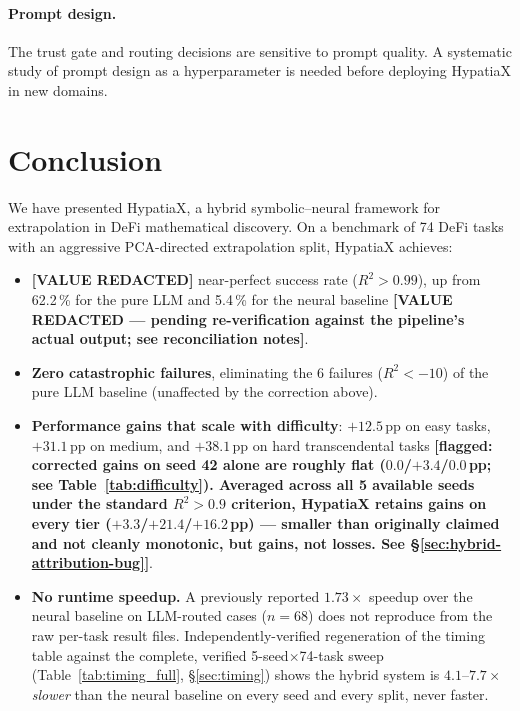 \documentclass[twoside,11pt]{article}
\newcommand{\Rsq}{R^{2}}
\begin{document}
\paragraph{Prompt design.}
The trust gate and routing decisions are sensitive to prompt quality.  A systematic
study of prompt design as a hyperparameter is needed before deploying HypatiaX
in new domains.

\section{Conclusion}
\label{sec:conclusion}

We have presented HypatiaX, a hybrid symbolic--neural framework for extrapolation
in DeFi mathematical discovery.  On a benchmark of 74 DeFi tasks with an aggressive
PCA-directed extrapolation split, HypatiaX achieves:

\begin{itemize}
  \item \textbf{[VALUE REDACTED]} near-perfect success rate ($\Rsq > 0.99$), up from
    62.2\,\% for the pure LLM and 5.4\,\% for the neural baseline
    \textbf{[VALUE REDACTED --- pending re-verification against the pipeline's actual output; see reconciliation notes]}.
  \item \textbf{Zero catastrophic failures}, eliminating the 6 failures ($\Rsq < -10$)
    of the pure LLM baseline (unaffected by the correction above).
  \item \textbf{Performance gains that scale with difficulty}: $+12.5$\,pp on easy tasks,
    $+31.1$\,pp on medium, and $+38.1$\,pp on hard transcendental tasks
    \textbf{[flagged: corrected gains on seed 42 alone are roughly flat
    ($0.0$/$+3.4$/$0.0$\,pp; see Table~\ref{tab:difficulty}). Averaged
    across all 5 available seeds under the standard $\Rsq>0.9$ criterion,
    HypatiaX retains gains on every tier ($+3.3$/$+21.4$/$+16.2$\,pp) ---
    smaller than originally claimed and not cleanly monotonic, but gains,
    not losses. See \S\ref{sec:hybrid-attribution-bug}]}.
  \item \textbf{No runtime speedup.} A previously reported $1.73\times$ speedup
    over the neural baseline on LLM-routed cases ($n=68$) does not reproduce
    from the raw per-task result files. Independently-verified regeneration
    of the timing table against the complete, verified 5-seed$\times$74-task
    sweep (Table~\ref{tab:timing_full}, \S\ref{sec:timing}) shows the hybrid
    system is $4.1$--$7.7\times$ \emph{slower} than the neural baseline on
    every seed and every split, never faster.
\end{itemize}
\end{document}
